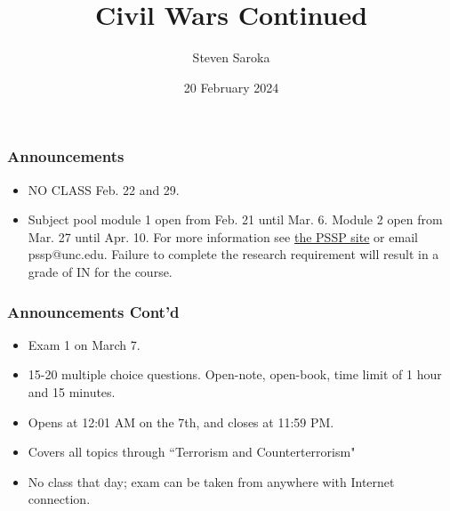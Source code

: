 \documentclass{beamer}
\title[Civil Wars 2]{\LARGE{Civil Wars Continued}}
\author[POLI 150]{Steven Saroka}
\institute{POLI 150}
\date{20 February 2024}
\begin{document}
\begin{frame}
\titlepage %
\end{frame}







	\begin{frame} 
	\frametitle{\LARGE{Announcements}}
	\begin{itemize}
		\item NO CLASS Feb. 22 and 29.
		\item Subject pool module 1 open from Feb. 21 until Mar. 6. Module 2 open from Mar. 27 until Apr. 10. For more information see \href{https://tarheels.live/psspparticipants/}{the PSSP site} or email pssp@unc.edu. Failure to complete the research requirement will result in a grade of IN for the course.
		
	\end{itemize}
\end{frame}

	\begin{frame} 
	\frametitle{\LARGE{Announcements Cont'd}}
	\begin{itemize}
		\item Exam 1 on March 7.
		\item 15-20 multiple choice questions. Open-note, open-book, time limit of 1 hour and 15 minutes.
		\item Opens at 12:01 AM on the 7th, and closes at 11:59 PM.
		\item Covers all topics through ``Terrorism and Counterterrorism"
		\item No class that day; exam can be taken from anywhere with Internet connection. 
		
	\end{itemize}
\end{frame}
\end{document}
